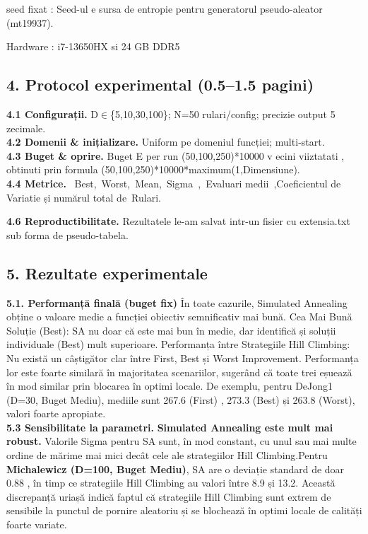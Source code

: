 \documentclass[
]{article}
\begin{document}
seed fixat : Seed-ul e sursa de entropie pentru generatorul
pseudo-aleator (mt19937).

Hardware : i7-13650HX si 24 GB DDR5

\hypertarget{protocol-experimental-0.51.5-pagini}{%
\subsection{4. Protocol experimental (0.5--1.5
pagini)}\label{protocol-experimental-0.51.5-pagini}}

\textbf{4.1 Configurații.} D$\in$\{5,10,30,100\}; N=50 rulari/config;
precizie output 5 zecimale.\\
\textbf{4.2 Domenii \& inițializare.} Uniform pe domeniul funcției;
multi‑start.\\
\textbf{4.3 Buget \& oprire.} Buget E per run (50,100,250)*10000 v ecini
viiztatati , obtinuti prin formula
(50,100,250)*10000*maximum(1,Dimensiune).\\
\textbf{4.4 Metrice.} ~Best,~Worst,~Mean,~Sigma~,~Evaluari
medii~,Coeficientul de Variatie și numărul total de~Rulari.

\textbf{4.6 Reproductibilitate.} Rezultatele le-am salvat intr-un fisier
cu extensia.txt sub forma de pseudo-tabela.

\hypertarget{rezultate-experimentale}{%
\subsection{\texorpdfstring{5. Rezultate experimentale
}{5. Rezultate experimentale }}\label{rezultate-experimentale}}

\textbf{5.1. Performanță finală (buget fix)} În toate cazurile,
Simulated Annealing obține o valoare medie a funcției obiectiv
semnificativ mai bună. Cea Mai Bună Soluție (Best): SA nu doar că este
mai bun în medie, dar identifică și soluții individuale (Best) mult
superioare. Performanța între Strategiile Hill Climbing: Nu există un
câștigător clar între First, Best și Worst Improvement. Performanța lor
este foarte similară în majoritatea scenariilor, sugerând că toate trei
eșuează în mod similar prin blocarea în optimi locale. De exemplu,
pentru DeJong1 (D=30, Buget Mediu), mediile sunt 267.6 (First) , 273.3
(Best) și 263.8 (Worst), valori foarte apropiate.\\
\textbf{5.3 Sensibilitate la parametri.} \textbf{Simulated Annealing
este mult mai robust.} Valorile Sigma pentru SA sunt, în mod constant,
cu unul sau mai multe ordine de mărime mai mici decât cele ale
strategiilor Hill Climbing.Pentru \textbf{Michalewicz (D=100, Buget
Mediu)}, SA are o deviație standard de doar 0.88 , în timp ce
strategiile Hill Climbing au valori între 8.9 și 13.2. Această
discrepanță uriașă indică faptul că strategiile Hill Climbing sunt
extrem de sensibile la punctul de pornire aleatoriu și se blochează în
optimi locale de calități foarte variate.
\end{document}
